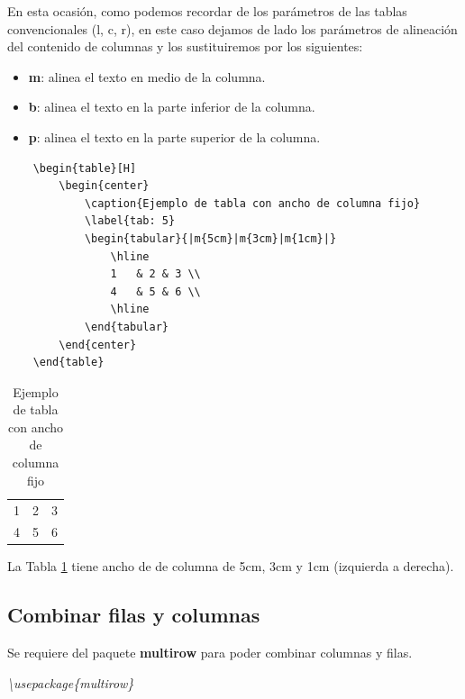 En esta ocasión, como podemos recordar de los parámetros de las tablas convencionales (l, c, r), en este caso dejamos de lado los parámetros de alineación del contenido de columnas y los sustituiremos por los siguientes:
\begin{itemize}
    \item \textbf{m}: alinea el texto en medio de la columna.
    \item \textbf{b}: alinea el texto en la parte inferior de la columna.
    \item \textbf{p}: alinea el texto en la parte superior de la columna.
\end{itemize}
\begin{lstlisting}
    \begin{table}[H]
        \begin{center}
            \caption{Ejemplo de tabla con ancho de columna fijo}
            \label{tab: 5}
            \begin{tabular}{|m{5cm}|m{3cm}|m{1cm}|}
                \hline
                1   & 2 & 3 \\
                4   & 5 & 6 \\
                \hline
            \end{tabular}
        \end{center}
    \end{table}
\end{lstlisting}
\begin{table}[H]
    \begin{center}
        \caption{Ejemplo de tabla con ancho de columna fijo}
        \label{tab: 5}
        \begin{tabular}{|m{5cm}|m{3cm}|m{1cm}|}
            \hline
            1   & 2 & 3 \\
            4   & 5 & 6 \\
            \hline
        \end{tabular}
    \end{center}
\end{table}

La Tabla \ref{tab: 5} tiene ancho de de columna de 5cm, 3cm y 1cm (izquierda a derecha).


\subsection{Combinar filas y columnas}

Se requiere del paquete \textbf{multirow} para poder combinar columnas y filas.
\begin{center}
    \textit{\textbackslash{usepackage\{multirow\}}}
\end{center}

